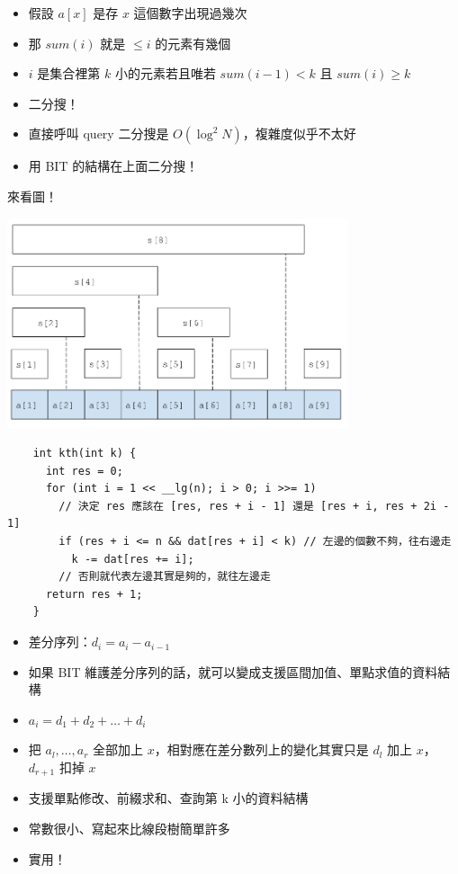 \documentclass[standalone]{beamer}
\begin{document}
\begin{frame}{}
  \begin{itemize}
    \item 假設 $a[x]$ 是存 $x$ 這個數字出現過幾次
    \item 那 $sum(i)$ 就是 $\le i$ 的元素有幾個
    \item $i$ 是集合裡第 $k$ 小的元素若且唯若 $sum(i - 1) < k$ 且 $sum(i) \ge k$
    \item 二分搜！
    \item 直接呼叫 query 二分搜是 $O(\log^2 N)$，複雜度似乎不太好
    \item 用 BIT 的結構在上面二分搜！
  \end{itemize}
\end{frame}

\begin{frame}{}
  來看圖！

  \includegraphics[width=10cm]{figures/bit.png}
\end{frame}


\begin{frame}[fragile]{}
  \begin{verbatim}
    int kth(int k) {
      int res = 0;
      for (int i = 1 << __lg(n); i > 0; i >>= 1)
        // 決定 res 應該在 [res, res + i - 1] 還是 [res + i, res + 2i - 1]
        if (res + i <= n && dat[res + i] < k) // 左邊的個數不夠，往右邊走
          k -= dat[res += i];
        // 否則就代表左邊其實是夠的，就往左邊走
      return res + 1;
    }
  \end{verbatim}
\end{frame}

\begin{frame}{}
  \begin{itemize}
    \item 差分序列：$d_i = a_i - a_{i - 1}$
    \item 如果 BIT 維護差分序列的話，就可以變成支援區間加值、單點求值的資料結構
    \item $a_i = d_1 + d_2 + \ldots + d_i$
    \item 把 $a_l, \ldots, a_r$ 全部加上 $x$，相對應在差分數列上的變化其實只是 $d_l$ 加上 $x$，$d_{r+1}$ 扣掉 $x$
  \end{itemize}
\end{frame}

\begin{frame}{}
  \begin{itemize}
    \item 支援單點修改、前綴求和、查詢第 k 小的資料結構
    \item 常數很小、寫起來比線段樹簡單許多
    \item 實用！
  \end{itemize}
\end{frame}
\end{document}
